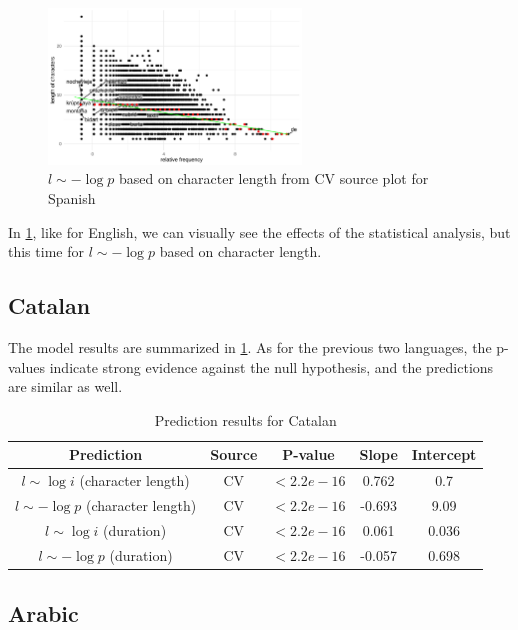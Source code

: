 \begin{figure}[H]
    \centering
    \includegraphics[width=0.6\textwidth]{plots/Spanish_logp_cl_CV.pdf}
    \caption{$l \sim -\log p$ based on character length from CV source plot for Spanish}
    \label{spanish_logp_cl_CV}
\end{figure}

In \cref{spanish_logp_cl_CV}, like for English, we can visually see the effects of the statistical analysis, but this time for $l \sim -\log p$ based on character length.

\subsection{Catalan}

The model results are summarized in \cref{tab:catalanresults}. As for the previous two languages, the p-values indicate strong evidence against the null hypothesis, and the predictions are similar as well.

\begin{table}[H]
    \centering
    \begin{tabular}{c|c|c|c|c}
        Prediction & Source & P-value & Slope & Intercept \\ \hline
        $l \sim \log i$ (character length) & CV & $<2.2e-16$ & 0.762 & 0.7 \\
        $l \sim -\log p$ (character length) & CV & $<2.2e-16$ & -0.693 & 9.09 \\
        $l \sim \log i$ (duration) & CV & $<2.2e-16$ & 0.061 & 0.036 \\
        $l \sim -\log p$ (duration) & CV & $<2.2e-16$ & -0.057 & 0.698 \\
    \end{tabular}
    \caption{Prediction results for Catalan}
    \label{tab:catalanresults}
\end{table}

\subsection{Arabic}

